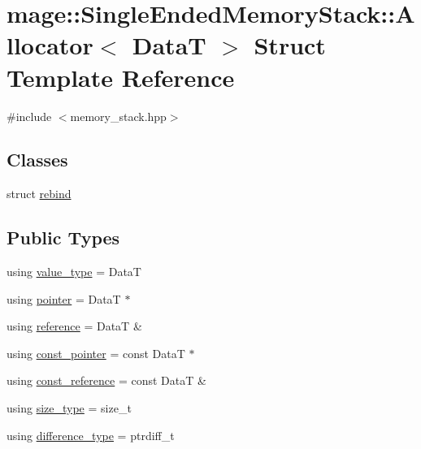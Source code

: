 \hypertarget{structmage_1_1_single_ended_memory_stack_1_1_allocator}{}\section{mage\+:\+:Single\+Ended\+Memory\+Stack\+:\+:Allocator$<$ DataT $>$ Struct Template Reference}
\label{structmage_1_1_single_ended_memory_stack_1_1_allocator}


{\ttfamily \#include $<$memory\+\_\+stack.\+hpp$>$}

\subsection*{Classes}
\begin{DoxyCompactItemize}
\item 
struct \hyperlink{structmage_1_1_single_ended_memory_stack_1_1_allocator_1_1rebind}{rebind}
\end{DoxyCompactItemize}
\subsection*{Public Types}
\begin{DoxyCompactItemize}
\item 
using \hyperlink{structmage_1_1_single_ended_memory_stack_1_1_allocator_a4d5b98a534ad4e6d6f2d8eb1280398ab}{value\+\_\+type} = DataT
\item 
using \hyperlink{structmage_1_1_single_ended_memory_stack_1_1_allocator_a2bc2a84329210a698f0e0bf76da88af3}{pointer} = DataT $\ast$
\item 
using \hyperlink{structmage_1_1_single_ended_memory_stack_1_1_allocator_a85ce7171363682bb03ec7b8ad5980b24}{reference} = DataT \&
\item 
using \hyperlink{structmage_1_1_single_ended_memory_stack_1_1_allocator_aaa595b8cfde6f045e5f87e5662b549f6}{const\+\_\+pointer} = const DataT $\ast$
\item 
using \hyperlink{structmage_1_1_single_ended_memory_stack_1_1_allocator_afe1303b90c8f68366f5c88e9a77d12c0}{const\+\_\+reference} = const DataT \&
\item 
using \hyperlink{structmage_1_1_single_ended_memory_stack_1_1_allocator_af04b72c8781cfb7148d8f0d4b0da41c3}{size\+\_\+type} = size\+\_\+t
\item 
using \hyperlink{structmage_1_1_single_ended_memory_stack_1_1_allocator_aebd7e5c612fbd49aea979bb115911359}{difference\+\_\+type} = ptrdiff\+\_\+t
\end{DoxyCompactItemize}
